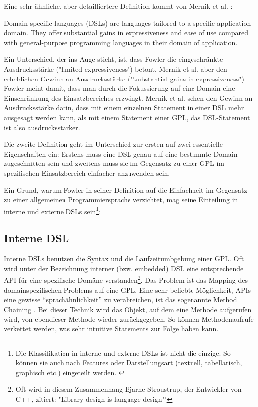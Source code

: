 Eine sehr ähnliche, aber detailliertere Definition kommt von Mernik et al. \cite{MeHe05}:

\begin{myquote}
Domain-specific languages (DSLs) are languages tailored to a specific application domain. They offer substantial gains in expressiveness and ease of use compared with general-purpose programming languages in their domain of application.
\end{myquote}


Ein Unterschied, der ins Auge sticht, ist, dass Fowler die eingeschränkte Ausdrucksstärke ("limited expressiveness") betont, Mernik et al. aber den erheblichen Gewinn an Ausdrucksstärke ("'substantial gains in expressiveness"). Fowler meint damit, dass man durch die Fokussierung auf eine Domain eine Einschränkung des Einsatzbereiches erzwingt. Mernik et al. sehen den Gewinn an Ausdrucksstärke darin, dass mit einem einzelnen Statement in einer DSL mehr ausgesagt werden kann, als mit einem Statement einer GPL, das DSL-Statement ist also ausdrucksstärker.

Die zweite Definition geht im Unterschied zur ersten auf zwei essentielle Eigenschaften ein: Erstens muss eine DSL genau auf eine bestimmte Domain zugeschnitten sein und zweitens muss sie im Gegensatz zu einer GPL im spezifischen Einsatzbereich einfacher anzuwenden sein.

Ein Grund, warum Fowler in seiner Definition auf die Einfachheit im Gegensatz zu einer allgemeinen Programmiersprache verzichtet, mag seine Einteilung in interne und externe DSLs \cite{FoPa10} sein\footnote{Die Klassifikation in interne und externe DSLs ist nicht die einzige. So können sie auch nach Features oder Darstellungsart (textuell, tabellarisch, graphisch etc.) eingeteilt werden. \cite{LaJi07} }:

\subsection{Interne DSL}

Interne DSLs benutzen die Syntax und die Laufzeitumbgebung einer GPL. Oft wird unter der Bezeichnung interner (bzw. embedded) DSL eine entsprechende API für eine spezifische Domäne verstanden\footnote{Oft wird in diesem Zusammenhang Bjarne Stroustrup, der Entwickler von C++, zitiert: "Library design is language design"'}.
Das Problem ist das Mapping des domainspezifischen Problems auf eine GPL. Eine sehr beliebte Möglichkeit, APIs eine gewisse ``sprachähnlichkeit'' zu verabreichen, ist das sogenannte Method Chaining
\cite{RuBa08}.
Bei dieser Technik wird das Objekt, auf dem eine Methode aufgerufen wird, von ebendieser Methode wieder zurückgegeben. So können Methodenaufrufe verkettet werden, was sehr intuitive Statements zur Folge haben kann.

